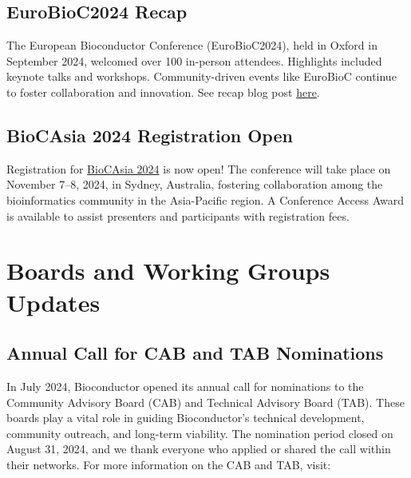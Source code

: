 \hypertarget{eurobioc2024-recap}{%
\subsection{EuroBioC2024 Recap}\label{eurobioc2024-recap}}

The European Bioconductor Conference (EuroBioC2024), held in Oxford in September 2024, welcomed over 100 in-person attendees. Highlights included keynote talks and workshops. Community-driven events like EuroBioC continue to foster collaboration and innovation. See recap blog post \href{https://blog.bioconductor.org/posts/2024-09-20-eurobioc2024-recap/}{here}.

\hypertarget{biocasia-2024-registration-open}{%
\subsection{BioCAsia 2024 Registration Open}\label{biocasia-2024-registration-open}}

Registration for \href{https://biocasia2024.bioconductor.org/}{BioCAsia 2024} is now open! The conference will take place on November 7--8, 2024, in Sydney, Australia, fostering collaboration among the bioinformatics community in the Asia-Pacific region. A Conference Access Award is available to assist presenters and participants with registration fees.

\hypertarget{boards-and-working-groups-updates}{%
\section{Boards and Working Groups Updates}\label{boards-and-working-groups-updates}}

\hypertarget{annual-call-for-cab-and-tab-nominations}{%
\subsection{Annual Call for CAB and TAB Nominations}\label{annual-call-for-cab-and-tab-nominations}}

In July 2024, Bioconductor opened its annual call for nominations to the Community Advisory Board (CAB) and Technical Advisory Board (TAB). These boards play a vital role in guiding Bioconductor's technical development, community outreach, and long-term viability. The nomination period closed on August 31, 2024, and we thank everyone who applied or shared the call within their networks. For more information on the CAB and TAB, visit:

